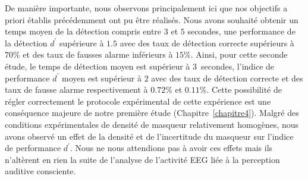 De manière importante, nous observons principalement ici que nos objectifs a priori établis précédemment ont pu être réalisés. 
Nous avons souhaité obtenir un temps moyen de la détection compris entre $3$ et $5$ secondes, une performance de la détection $d^\prime$ supérieure à $1.5$ avec des taux de détection correcte supérieurs à $70\%$ et des taux de fausses alarme inférieurs à $15\%$. 
Ainsi, pour cette seconde étude, le temps de détection moyen est supérieur à $3$~secondes, l'indice de performance $d^\prime$ moyen est supérieur à $2$ avec des taux de détection correcte et des taux de fausse alarme respectivement à $0.72\%$ et $0.11\%$. 
Cette possibilité de régler correctement le protocole expérimental de cette expérience est une conséquence majeure de notre première étude (Chapitre~\ref{chapitre4}). 
Malgré des conditions expérimentales de densité de masqueur relativement homogènes, nous avons observé un effet de la densité et de l'incertitude du masqueur sur l'indice de performance $d^\prime$. 
Nous ne nous attendions pas à avoir ces effets mais ils n'altèrent en rien la suite de l'analyse de l'activité EEG liée à la perception auditive consciente. 


